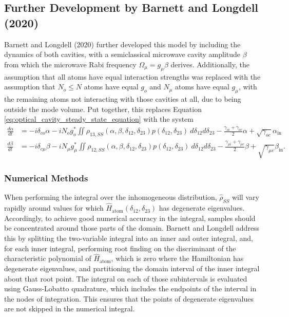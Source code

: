\subsection{\label{subs:barnett_longdell_development}Further Development by Barnett and Longdell (2020)}
Barnett and Longdell (2020) \cite{barnett_longdell_2020} further developed this model by including the dynamics of both cavities, with a semiclassical microwave cavity amplitude $\beta$ from which the microwave Rabi frequency $\Omega_\mu = g_\mu\beta$ derives. Additionally, the assumption that all atoms have equal interaction strengths was replaced with the assumption that $N_o \leq N$ atoms have equal $g_o$ and $N_\mu$ atoms have equal $g_\mu$, with the remaining atoms not interacting with those cavities at all, due to being outside the mode volume. Put together, this replaces Equation \ref{eq:optical_cavity_steady_state_equation} with the system
\begin{align}
    \frac{d\alpha}{dt} &= -i\delta_{co}\alpha -iN_og_o^* \iint \rho_{13,SS}(\alpha, \beta, \delta_{12}, \delta_{23}) p(\delta_{12}, \delta_{23})\:d\delta_{12}d\delta_{23} - \frac{\gamma_{oi}+\gamma_{oc}}{2}\alpha + \sqrt{\gamma_{oc}}\alpha_\text{in}\\
    \frac{d\beta}{dt} &= -i\delta_{c\mu}\beta -iN_\mu g_\mu^* \iint \rho_{12,SS}(\alpha, \beta, \delta_{12}, \delta_{23}) p(\delta_{12}, \delta_{23})\:d\delta_{12}d\delta_{23} - \frac{\gamma_{\mu i}+\gamma_{\mu c}}{2}\beta + \sqrt{\gamma_{\mu c}}\beta_\text{in}.
\end{align}

\subsubsection{\label{ssubs:barnett_longdell_numerical_methods}Numerical Methods}
When performing the integral over the inhomogeneous distribution, $\hat{\rho}_{SS}$ will vary rapidly around values for which $\hat{H}_\text{atom}(\delta_{12}, \delta_{23})$ has degenerate eigenvalues. Accordingly, to achieve good numerical accuracy in the integral, samples should be concentrated around those parts of the domain. Barnett and Longdell address this by splitting the two-variable integral into an inner and outer integral, and, for each inner integral, performing root finding on the discriminant of the characteristic polynomial of $\hat{H}_\text{atom}$, which is zero where the Hamiltonian has degenerate eigenvalues, and partitioning the domain interval of the inner integral about that root point. The integral on each of those subintervals is evaluated using Gauss-Lobatto quadrature\cite{faul_book}, which includes the endpoints of the interval in the nodes of integration. This ensures that the points of degenerate eigenvalues are not skipped in the numerical integral.

